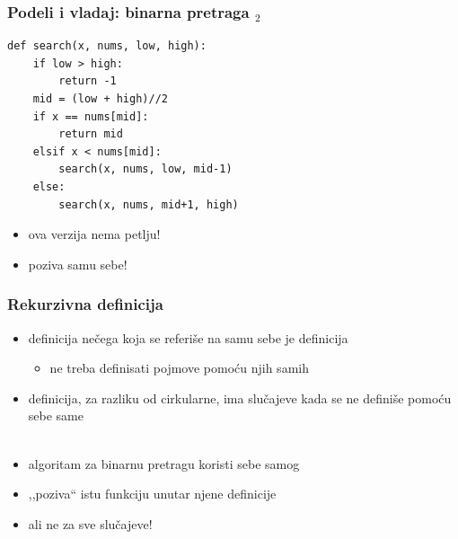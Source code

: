 \documentclass[utf8,compress,aspectratio=169]{beamer}
\begin{document}
\begin{frame}[fragile]
  \frametitle{Podeli i vladaj: binarna pretraga $_2$}
\begin{verbatim}
def search(x, nums, low, high):
    if low > high:
        return -1
    mid = (low + high)//2
    if x == nums[mid]:
        return mid
    elsif x < nums[mid]:
        search(x, nums, low, mid-1)
    else:
        search(x, nums, mid+1, high)
\end{verbatim}
  \begin{itemize}
    \item ova verzija nema petlju!
    \item poziva samu sebe!
  \end{itemize}
\end{frame}

\begin{frame}[fragile]
  \frametitle{Rekurzivna definicija}
  \begin{itemize}
    \item definicija nečega koja se referiše na samu sebe je  definicija
    \begin{itemize}
      \item ne treba definisati pojmove pomoću njih samih
    \end{itemize}
    \item {} definicija, za razliku od cirkularne, ima slučajeve kada
      se ne definiše pomoću sebe same \\ \ \\
    \item algoritam za binarnu pretragu koristi sebe samog
    \item ,,poziva`` istu funkciju unutar njene definicije
    \item ali ne za sve slučajeve!
  \end{itemize}
\end{frame}
\end{document}

